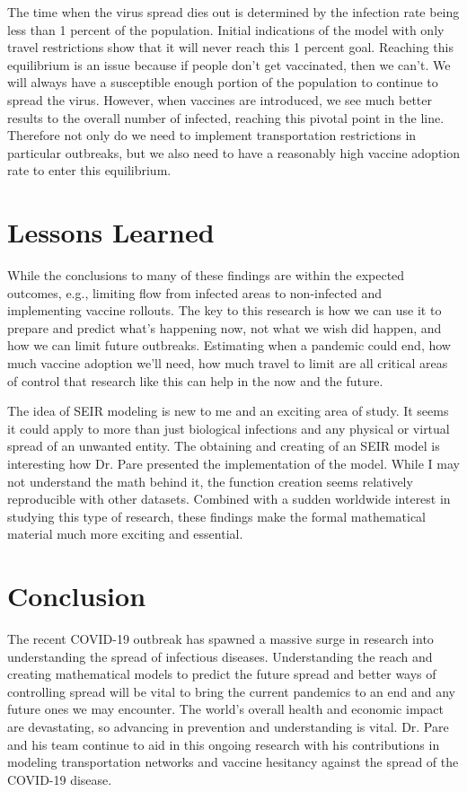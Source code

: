 \documentclass[journal,onecolumn]{IEEEtran}
\begin{document}
The time when the virus spread dies out is determined by the infection rate being less than 1 percent of the population. Initial indications of the model with only travel restrictions show that it will never reach this 1 percent goal. Reaching this equilibrium is an issue because if people don't get vaccinated, then we can't. We will always have a susceptible enough portion of the population to continue to spread the virus. However, when vaccines are introduced, we see much better results to the overall number of infected, reaching this pivotal point in the line. Therefore not only do we need to implement transportation restrictions in particular outbreaks, but we also need to have a reasonably high vaccine adoption rate to enter this equilibrium.

\section{Lessons Learned}

While the conclusions to many of these findings are within the expected outcomes, e.g., limiting flow from infected areas to non-infected and implementing vaccine rollouts. The key to this research is how we can use it to prepare and predict what's happening now, not what we wish did happen, and how we can limit future outbreaks. Estimating when a pandemic could end, how much vaccine adoption we'll need, how much travel to limit are all critical areas of control that research like this can help in the now and the future. 

The idea of SEIR modeling is new to me and an exciting area of study. It seems it could apply to more than just biological infections and any physical or virtual spread of an unwanted entity. The obtaining and creating of an SEIR model is interesting how Dr. Pare presented the implementation of the model. While I may not understand the math behind it, the function creation seems relatively reproducible with other datasets. Combined with a sudden worldwide interest in studying this type of research, these findings make the formal mathematical material much more exciting and essential. 

\section{Conclusion}
The recent COVID-19 outbreak has spawned a massive surge in research into understanding the spread of infectious diseases. Understanding the reach and creating mathematical models to predict the future spread and better ways of controlling spread will be vital to bring the current pandemics to an end and any future ones we may encounter. The world's overall health and economic impact are devastating, so advancing in prevention and understanding is vital. Dr. Pare and his team continue to aid in this ongoing research with his contributions in modeling transportation networks and vaccine hesitancy against the spread of the COVID-19 disease. 
\end{document}
